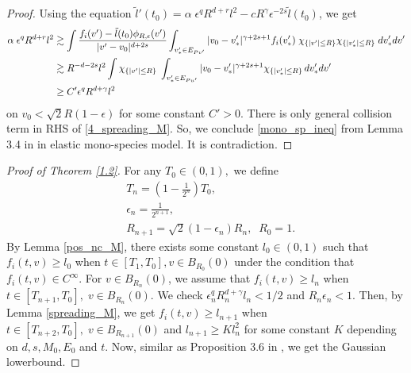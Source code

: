 \documentclass[reqno,10pt]{amsart}
\numberwithin{equation}{section}
\begin{document}
\begin{proof}
\noindent Using the equation $\tilde{l}'(t_0)=\alpha\;\epsilon^q R^{d+r}l^2-cR^{\gamma}\epsilon^{-2s}\tilde{l}(t_0)$, we get  
\begin{align}
   \alpha\;\epsilon^q R^{d+r}l^2
   &\gtrsim \int \frac{f_i(v')-\tilde{l}(t_0)\phi_{R,\epsilon}(v')}{|v'-v_0|^{d+2s}}\int_{v_*'\in E_{Pv'}} |v_0-v_*'|^{\gamma+2s+1}f_i(v_*')\;\chi_{\{|v'|\leq R\}}\chi_{\{|v_*'|\leq R\}}\; dv_*'dv'\notag \\ 
   &\gtrsim  R^{-d-2s}l^2 \int \chi_{\{|v'|\leq R\}}\;\int_{v_*'\in E_{Pu'}}|v_0-v_*'|^{\gamma+2s+1} \chi_{\{|v_*'|\leq R\}} \, dv_*' dv' \notag \notag \\  
    &\geq C'\epsilon^q R^{d+\gamma}l^2  \label{mono_sp_ineq}
\end{align} on $v_0<\sqrt{2}R(1-\epsilon)$ for some constant $C'>0.$ There is only general collision term in RHS of \eqref{4_spreading_M}. So, we conclude \eqref{mono_sp_ineq} from Lemma 3.4 in \cite{IM2020} in elastic mono-species model. It is contradiction. 
\end{proof} \vspace{3mm}

\begin{proof} [Proof of Theorem \ref{1.2}]
For any $T_0 \in (0,1),$ we define 
\begin{align*} 
     &T_n = (1-\frac{1}{2^{n}})T_0, \\
      &\epsilon_n=\frac{1}{2^{n+1}}, \\
       &R_{n+1}=\sqrt{2}(1-\epsilon_n)R_n, \;\; R_0=1.
\end{align*}
By Lemma \ref{pos_nc_M}, there exists some constant $l_0 \in (0,1)$ such that $f_i(t,v) \geq l_0$ when $t \in [T_1,T_0], v \in B_{R_0}(0)$ under the condition that $f_i(t,v) \in C^{\infty}.$ For $v \in B_{R_n}(0)$, 
we assume that $f_i(t,v) \geq l_n$ when $t \in [T_{n+1},T_0], \; v \in B_{R_n}(0)$. We check $\epsilon_n^q R_n^{d+\gamma}l_n < 1/2$ and $R_n\epsilon_n<1$. 
Then, by Lemma \ref{spreading_M}, we get \;$f_i(t,v) \geq l_{n+1}$ when $t \in [T_{n+2},T_0], \; v \in B_{R_{n+1}}(0)$ and $l_{n+1} \geq K l_n^{2}$ for some constant $K$ depending on $d, s, M_0, E_0$ and $t.$ Now, similar as Proposition 3.6 in \cite{IM2020}, we get the Gaussian lowerbound.
\end{proof} \vspace{2mm}
\end{document}
